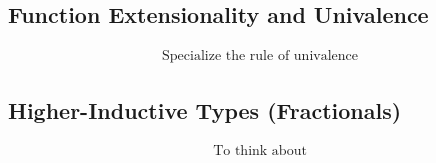 \documentclass[format=acmlarge,review,natbib]{acmart}
\begin{document}
\subsection{Function Extensionality and Univalence}

\[
  \begin{array}{c}
    \mbox{Specialize the rule of univalence}
  \end{array}
\]

\subsection{Higher-Inductive Types (Fractionals)}

\[
  \begin{array}{c}
    \mbox{To think about}
  \end{array}
\]


{\footnotesize

}
\end{document}
